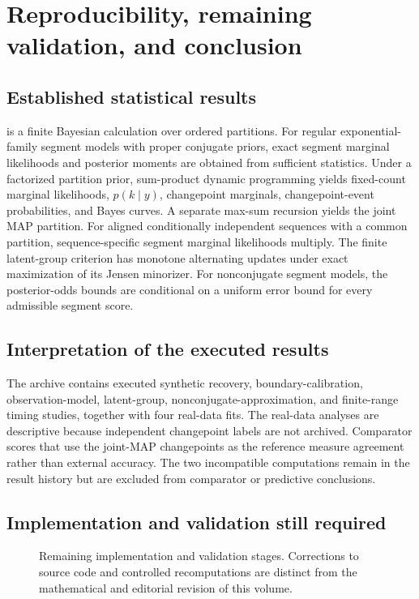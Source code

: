 \chapter{Reproducibility, remaining validation, and conclusion}
\label{ch:conclusion}\label{sec:conclusion}

\section{Established statistical results}
\BayesBreak is a finite Bayesian calculation over ordered partitions. For regular
exponential-family segment models with proper conjugate priors, exact segment marginal likelihoods
and posterior moments are obtained from sufficient statistics. Under a factorized partition prior,
sum-product dynamic programming yields fixed-count marginal likelihoods, $p(k\mid y)$,
changepoint marginals, changepoint-event probabilities, and Bayes curves. A separate max-sum
recursion yields the joint MAP partition. For aligned conditionally independent sequences with a
common partition, sequence-specific segment marginal likelihoods multiply. The finite latent-group
criterion has monotone alternating updates under exact maximization of its Jensen minorizer. For
nonconjugate segment models, the posterior-odds bounds are conditional on a uniform error bound for
every admissible segment score.

\section{Interpretation of the executed results}
The archive contains executed synthetic recovery, boundary-calibration, observation-model,
latent-group, nonconjugate-approximation, and finite-range timing studies, together with four
real-data fits. The real-data analyses are descriptive because independent changepoint labels are
not archived. Comparator scores that use the \BayesBreak joint-MAP changepoints as the reference
measure agreement rather than external accuracy. The two incompatible computations remain in the
result history but are excluded from comparator or predictive conclusions.

\section{Implementation and validation still required}
\begin{figure}[H]
\centering
\resizebox{0.96\textwidth}{!}{}
\caption{Remaining implementation and validation stages. Corrections to source code and controlled
recomputations are distinct from the mathematical and editorial revision of this volume.}
\label{fig:implementation-gates}
\end{figure}

